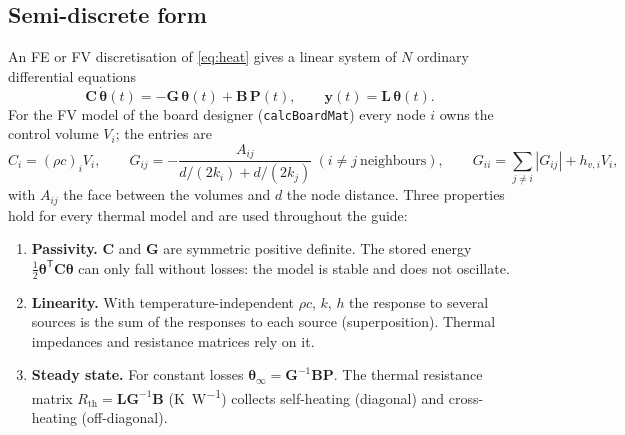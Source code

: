 \documentclass[11pt,a4paper]{article}
\newcommand{\Rth}{R_{\mathrm{th}}}
\newcommand{\T}{^{\mathsf T}}
\newcommand{\mat}[1]{\bm{#1}}
\begin{document}
\subsection{Semi-discrete form}
An FE or FV discretisation of \eqref{eq:heat} gives a linear system of $N$ ordinary differential equations
\begin{equation}
  \mat C\,\dot{\bm\theta}(t) = -\mat G\,\bm\theta(t) + \mat B\,\bm P(t), \qquad \bm y(t) = \mat L\,\bm\theta(t).
  \label{eq:fom}
\end{equation}
For the FV model of the board designer (\texttt{calcBoardMat}) every node $i$ owns the control volume $V_i$; the
entries are
\begin{equation}
  C_i = (\rho c)_i V_i,\qquad G_{ij} = -\frac{A_{ij}}{d/(2k_i)+d/(2k_j)}\ (i\neq j\ \text{neighbours}),\qquad
  G_{ii} = \sum_{j\neq i}|G_{ij}| + h_{v,i}V_i,
\end{equation}
with $A_{ij}$ the face between the volumes and $d$ the node distance. Three properties hold for every thermal model
and are used throughout the guide:
\begin{enumerate}
  \item \textbf{Passivity.} $\mat C$ and $\mat G$ are symmetric positive definite. The stored energy
        $\tfrac12\bm\theta\T\mat C\bm\theta$ can only fall without losses: the model is stable and does not oscillate.
  \item \textbf{Linearity.} With temperature-independent $\rho c$, $k$, $h$ the response to several sources is the
        sum of the responses to each source (superposition). Thermal impedances and resistance matrices rely on it.
  \item \textbf{Steady state.} For constant losses $\bm\theta_\infty = \mat G^{-1}\mat B\bm P$. The thermal resistance
        matrix $\Rth = \mat L\mat G^{-1}\mat B$ (\si{\kelvin\per\watt}) collects self-heating (diagonal) and
        cross-heating (off-diagonal).
\end{enumerate}
\end{document}
